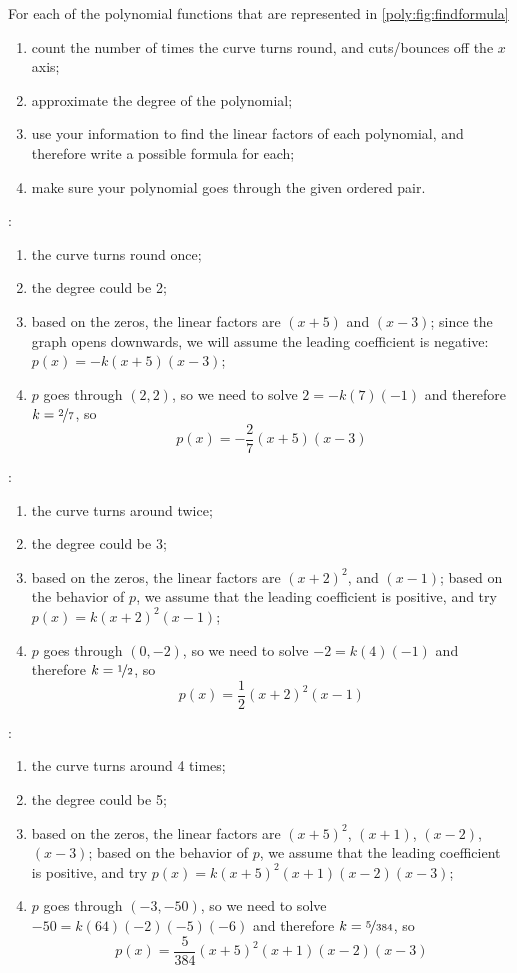 \investigation*{}
\begin{problem}
For each of the polynomial functions that are represented in \cref{poly:fig:findformula}
\begin{enumerate}
	\item count the number of times the curve turns round, and cuts/bounces off the $x$ axis;
	\item approximate the degree of the polynomial;
	\item use your information to find the linear factors of each polynomial, and therefore write a possible formula for each;
	\item make sure your polynomial goes through the given ordered pair.
\end{enumerate}
\begin{shortsolution}
	: 
	\begin{enumerate}
		\item the curve turns round once;
		\item the degree could be 2;
		\item based on the zeros, the linear factors are $(x+5)$ and $(x-3)$; since the 
		graph opens downwards, we will assume the leading coefficient is negative: $p(x)=-k(x+5)(x-3)$;
		\item $p$ goes through $(2,2)$, so we need to solve $2=-k(7)(-1)$ and therefore $k=\nicefrac{2}{7}$, so
		\[
			p(x)=-\frac{2}{7}(x+5)(x-3)
		\]
	\end{enumerate}
	:
	\begin{enumerate}
		\item the curve turns around twice;
		\item the degree could be 3;
		\item based on the zeros, the linear factors are $(x+2)^2$, and $(x-1)$;
		based on the behavior of $p$, we assume that the leading coefficient is positive, and try $p(x)=k(x+2)^2(x-1)$;
		\item $p$ goes through $(0,-2)$, so we need to solve $-2=k(4)(-1)$ and therefore $k=\nicefrac{1}{2}$, so
		\[
			p(x)=\frac{1}{2}(x+2)^2(x-1)
		\]
	\end{enumerate}
	:
	\begin{enumerate}
		\item the curve turns around 4 times;
		\item the degree could be 5;
		\item based on the zeros, the linear factors are $(x+5)^2$, $(x+1)$, $(x-2)$, $(x-3)$;
		based on the behavior of $p$, we assume that the leading coefficient is positive, and try $p(x)=k(x+5)^2(x+1)(x-2)(x-3)$;
		\item $p$ goes through $(-3,-50)$, so we need to solve $-50=k(64)(-2)(-5)(-6)$ and therefore $k=\nicefrac{5}{384}$, so
		\[
			p(x)=\frac{5}{384}(x+5)^2(x+1)(x-2)(x-3)
		\]
	\end{enumerate}
\end{shortsolution}
\end{problem}


